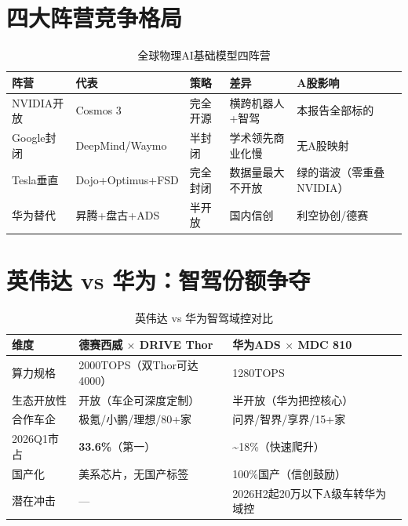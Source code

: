 \section{四大阵营竞争格局}

\begin{table}[H]
\centering\scriptsize
\renewcommand{\arraystretch}{1.3}
\begin{tabularx}{\textwidth}{l l l l X}
\toprule
\textbf{阵营} & \textbf{代表} & \textbf{策略} & \textbf{差异} & \textbf{A股影响} \\
\midrule
\textcolor{riskgreen}{NVIDIA开放} & Cosmos 3 & 完全开源 & 横跨机器人+智驾 & 本报告全部标的 \\
\textcolor{riskamber}{Google封闭} & DeepMind/Waymo & 半封闭 & 学术领先商业化慢 & 无A股映射 \\
\textcolor{riskred}{Tesla垂直} & Dojo+Optimus+FSD & 完全封闭 & 数据量最大不开放 & 绿的谐波（零重叠NVIDIA） \\
华为替代 & 昇腾+盘古+ADS & 半开放 & 国内信创 & 利空协创/德赛 \\
\bottomrule
\end{tabularx}
\caption{全球物理AI基础模型四阵营}
\end{table}

\section{英伟达 vs 华为：智驾份额争夺}

\begin{table}[H]
\centering\small
\renewcommand{\arraystretch}{1.2}
\begin{tabularx}{\textwidth}{l X X}
\toprule
\textbf{维度} & \textbf{德赛西威 $\times$ DRIVE Thor} & \textbf{华为ADS $\times$ MDC 810} \\
\midrule
算力规格 & 2000TOPS（双Thor可达4000） & 1280TOPS \\
生态开放性 & 开放（车企可深度定制） & 半开放（华为把控核心） \\
合作车企 & 极氪/小鹏/理想/80+家 & 问界/智界/享界/15+家 \\
2026Q1市占 & \textbf{33.6\%}（第一） & \textasciitilde18\%（快速爬升） \\
国产化 & 美系芯片，无国产标签 & 100\%国产（信创鼓励） \\
潜在冲击 & — & 2026H2起20万以下A级车转华为域控 \\
\bottomrule
\end{tabularx}
\caption{英伟达 vs 华为智驾域控对比}
\end{table}

